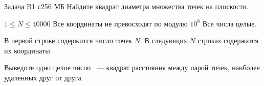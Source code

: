 \begin{problem}{Задача B}{1 с}{256 МБ}
Найдите квадрат диаметра множества точек на плоскости.

\Limit

$1 \le N \le 40000$
Все координаты не превосходят по модулю $10^8$
Все числа целые.

\InputFile
В первой строке содержится число точек $N$.
В следующих $N$ строках содержатся их координаты.

\OutputFile
Выведите одно целое число ~--- квадрат расстояния между
парой точек, наиболее удаленных друг от друга.

\Example
\begin{example}
\end{example}
\end{problem}
